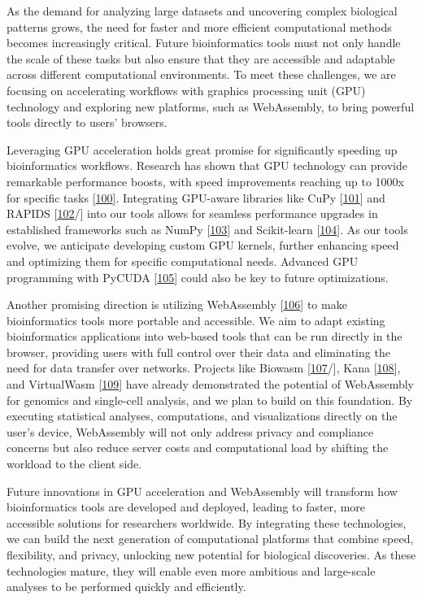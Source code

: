 As the demand for analyzing large datasets and uncovering complex biological patterns grows, the need for faster and more efficient computational methods becomes increasingly critical.
Future bioinformatics tools must not only handle the scale of these tasks but also ensure that they are accessible and adaptable across different computational environments.
To meet these challenges, we are focusing on accelerating workflows with graphics processing unit (GPU) technology and exploring new platforms, such as WebAssembly, to bring powerful tools directly to users' browsers.

Leveraging GPU acceleration holds great promise for significantly speeding up bioinformatics workflows.
Research has shown that GPU technology can provide remarkable performance boosts, with speed improvements reaching up to 1000x for specific tasks {[}\protect\hyperlink{ref-1EIbaYHGq}{100}{]}.
Integrating GPU-aware libraries like CuPy {[}\protect\hyperlink{ref-JMQXR7X9}{101}{]} and RAPIDS {[}\protect\hyperlink{ref-wPsNXL1Q}{102}/{]} into our tools allows for seamless performance upgrades in established frameworks such as NumPy {[}\protect\hyperlink{ref-1LexfAxj}{103}{]} and Scikit-learn {[}\protect\hyperlink{ref-AujvwLp6}{104}{]}.
As our tools evolve, we anticipate developing custom GPU kernels, further enhancing speed and optimizing them for specific computational needs.
Advanced GPU programming with PyCUDA {[}\protect\hyperlink{ref-b5xmRoLZ}{105}{]} could also be key to future optimizations.

Another promising direction is utilizing WebAssembly {[}\protect\hyperlink{ref-ITQaZvrQ}{106}{]} to make bioinformatics tools more portable and accessible.
We aim to adapt existing bioinformatics applications into web-based tools that can be run directly in the browser, providing users with full control over their data and eliminating the need for data transfer over networks.
Projects like Biowasm {[}\protect\hyperlink{ref-Z0f406Zs}{107}/{]}, Kana {[}\protect\hyperlink{ref-1DswCJYT0}{108}{]}, and VirtualWasm {[}\protect\hyperlink{ref-WhJVE7a4}{109}{]} have already demonstrated the potential of WebAssembly for genomics and single-cell analysis, and we plan to build on this foundation.
By executing statistical analyses, computations, and visualizations directly on the user's device, WebAssembly will not only address privacy and compliance concerns but also reduce server costs and computational load by shifting the workload to the client side.

Future innovations in GPU acceleration and WebAssembly will transform how bioinformatics tools are developed and deployed, leading to faster, more accessible solutions for researchers worldwide.
By integrating these technologies, we can build the next generation of computational platforms that combine speed, flexibility, and privacy, unlocking new potential for biological discoveries.
As these technologies mature, they will enable even more ambitious and large-scale analyses to be performed quickly and efficiently.

